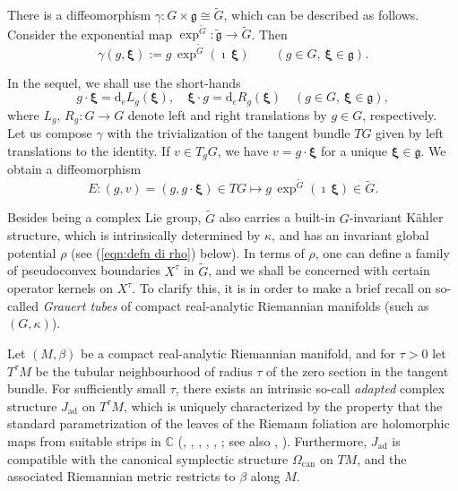\documentclass[12pt,a4paper]{article}
\theoremstyle{plain}
\theoremstyle{definition}
\begin{document}
There is a diffeomorphism  
$\gamma:G\times \mathfrak{g}\cong\tilde{G} $, which can be described as follows.
Consider the
exponential map 
$\exp^{\tilde{G}}:\tilde{\mathfrak{g}}\rightarrow \tilde{G}$.
Then 
\begin{equation}
\label{eqn:trivializationtildeG}
\gamma (g,\boldsymbol{\xi}):=
g\,\exp^{\tilde{G}}(\imath\,\boldsymbol{\xi})\qquad
(g\in G,\,\boldsymbol{\xi}\in \mathfrak{g}).
\end{equation}
%

In the sequel, 
we shall use the
short-hands
$$
g\cdot \boldsymbol{\xi}=\mathrm{d}_e L_g(\boldsymbol{\xi}),
\quad \boldsymbol{\xi}\cdot g=\mathrm{d}_e R_g(\boldsymbol{\xi})\quad 
(g\in G,\,\boldsymbol{\xi}\in \mathfrak{g}),
$$
where $L_g,\,R_g:G\rightarrow G$ denote left and right translations by
$g\in G$, respectively.
Let us compose $\gamma$ with the trivialization of the tangent bundle
$TG$ given by left translations to the identity. 
If $v\in T_gG$,
we have $v=g\cdot \boldsymbol{\xi}$ for a unique
$\boldsymbol{\xi}\in \mathfrak{g}$. 
We obtain a diffeomorphism
\begin{equation}
\label{eqn:defn of gamma'}
E:(g,v)=(g,g\cdot \boldsymbol{\xi})\in TG\mapsto 
g\,\exp^{\tilde{G}}(\imath\,\boldsymbol{\xi})\in \tilde{G}.
\end{equation}

Besides being a complex Lie group, $\tilde{G}$ also
carries a built-in $G$-invariant K\"{a}hler structure,
which is intrinsically determined by $\kappa$, and
has an invariant global potential $\rho$ (see (\ref{eqn:defn di rho})
below). 
In terms of $\rho$, one can define a family of
pseudoconvex boundaries $X^\tau$ in $\tilde{G}$, and
we shall be concerned with certain operator kernels
on $X^\tau$.
To clarify this, it is in order to make a brief recall
on so-called \textit{Grauert tubes} 
of compact real-analytic Riemannian manifolds
(such as $(G,\kappa)$).

Let $(M,\beta)$ be a compact real-analytic Riemannian manifold,
and for $\tau>0$ let $T^\tau M$ be the tubular neighbourhood of 
radius $\tau$ 
of the zero section in the tangent
bundle. For sufficiently small $\tau$, 
there exists an intrinsic
so-call \textit{adapted} complex structure
$J_{\mathrm{ad}}$ on $T^\tau M$, which is uniquely characterized by the property that the standard parametrization  of the leaves of the Riemann foliation are holomorphic  maps
from suitable strips in $\mathbb{C}$ (\cite{pw1},
\cite{pw2}, \cite{gs1}, \cite{gs2}, \cite{ls}, \cite{szo91}; see also \cite{b}, \cite{bh}). Furthermore, $J_{\mathrm{ad}}$
is compatible with the canonical
symplectic structure $\Omega_{\mathrm{can}}$
on $TM$, and the associated Riemannian metric restricts to $\beta$
along $M$. 
\end{document}
